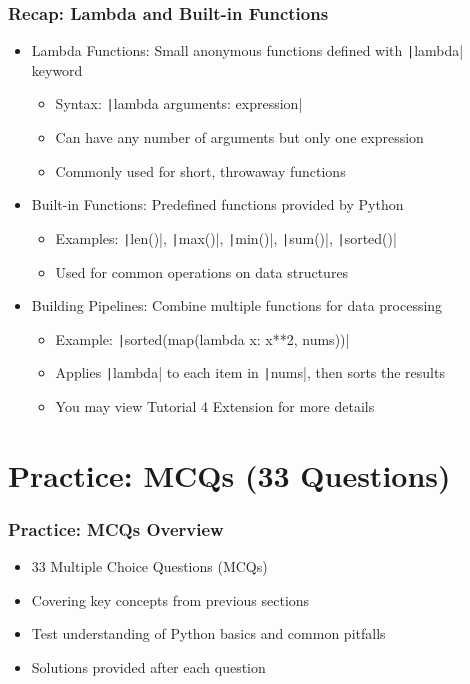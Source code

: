 \documentclass{beamer}
\newcommand{\python}[1]{\texttt|#1|}
\begin{document}
\begin{frame}
    \frametitle{Recap: Lambda and Built-in Functions}
    \begin{itemize}
        \item Lambda Functions: Small anonymous functions defined with \python{lambda} keyword
              \begin{itemize}
                  \item Syntax: \python{lambda arguments: expression}
                  \item Can have any number of arguments but only one expression
                  \item Commonly used for short, throwaway functions
              \end{itemize}
        \item Built-in Functions: Predefined functions provided by Python
              \begin{itemize}
                  \item Examples: \python{len()}, \python{max()}, \python{min()}, \python{sum()}, \python{sorted()}
                  \item Used for common operations on data structures
              \end{itemize}
        \item Building Pipelines: Combine multiple functions for data processing
              \begin{itemize}
                  \item Example: \python{sorted(map(lambda x: x**2, nums))}
                  \item Applies \python{lambda} to each item in \python{nums}, then sorts the results
                  \item You may view Tutorial 4 Extension for more details
              \end{itemize}
    \end{itemize}
\end{frame}

\section{Practice: MCQs (33 Questions)}
\begin{frame}
    \frametitle{Practice: MCQs Overview}
    \begin{itemize}
        \item 33 Multiple Choice Questions (MCQs)
        \item Covering key concepts from previous sections
        \item Test understanding of Python basics and common pitfalls
        \item Solutions provided after each question
    \end{itemize}
\end{frame}
\end{document}

